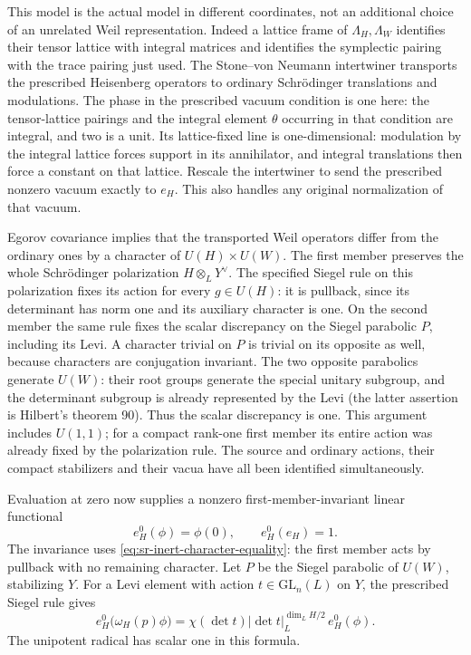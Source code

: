 This model is the actual model in different coordinates, not an
additional choice of an unrelated Weil representation.
Indeed a lattice frame of \(\Lambda_H,\Lambda_W\) identifies their
tensor lattice with integral matrices and identifies the symplectic
pairing with the trace pairing just used. The Stone--von Neumann
intertwiner transports the prescribed Heisenberg operators to
ordinary Schr\"odinger translations and modulations.
The phase in the prescribed vacuum condition is one here:
the tensor-lattice pairings and the integral element \(\theta\)
occurring in that condition are integral, and two is a unit.
Its lattice-fixed line is one-dimensional: modulation by the
integral lattice forces support in its annihilator, and integral
translations then force a constant on that lattice.
Rescale the intertwiner to send the prescribed nonzero vacuum
exactly to \(e_H\). This also handles any original normalization
of that vacuum.

Egorov covariance implies that the transported Weil operators
differ from the ordinary ones by a character of
\(U(H)\times U(W)\). The first member preserves the whole
Schr\"odinger polarization \(H\otimes_LY^\vee\).
The specified Siegel rule on this polarization fixes its action
for every \(g\in U(H)\): it is pullback, since its determinant
has norm one and its auxiliary character is one.
On the second member the same rule fixes the scalar discrepancy
on the Siegel parabolic \(P\), including its Levi.
A character trivial on \(P\) is trivial on its opposite as well,
because characters are conjugation invariant.
The two opposite parabolics generate \(U(W)\):
their root groups generate the special unitary subgroup, and
the determinant subgroup is already represented by the Levi
(the latter assertion is Hilbert's theorem 90).
Thus the scalar discrepancy is one. This argument includes
\(U(1,1)\); for a compact rank-one first member its entire action
was already fixed by the polarization rule.
The source and ordinary actions, their compact stabilizers
and their vacua have all been identified simultaneously.

Evaluation at zero now supplies a nonzero first-member-invariant
linear functional
\[
       e_H^0(\phi)=\phi(0),\qquad e_H^0(e_H)=1.
\]
The invariance uses \eqref{eq:sr-inert-character-equality}:
the first member acts by pullback with no remaining character.
Let \(P\) be the Siegel parabolic of \(U(W)\), stabilizing \(Y\).
For a Levi element with action \(t\in\mathrm{GL}_n(L)\) on \(Y\),
the prescribed Siegel rule gives
\begin{equation}\label{eq:sr-inert-parabolic-functional}
 e_H^0\bigl(\omega_H(p)\phi\bigr)
   =\chi(\det t)|\det t|_L^{\dim_L H/2}\,e_H^0(\phi).
\end{equation}
The unipotent radical has scalar one in this formula.

